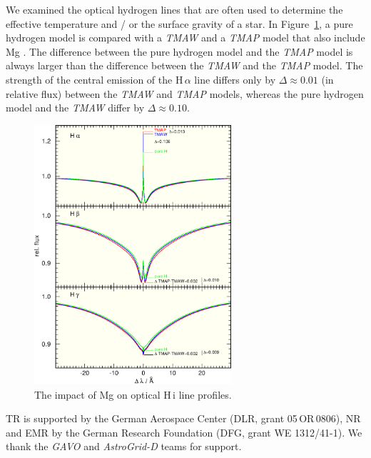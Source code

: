 We examined the optical hydrogen lines that are often used to determine the effective temperature and / or the surface gravity of a star. In Figure~\ref{fig:HMg}, a pure hydrogen model is compared with a \emph{TMAW} and a \emph{TMAP} model that also include Mg \citep[$T_\mathrm{eff}=60\,\mathrm{kK}$, $\log g = 7$, solar abundances,][]{asplundetal2009}. The difference between the pure hydrogen model and the  \emph{TMAP} model is always larger than the difference between the \emph{TMAW} and the \emph{TMAP} model. The strength of the central emission of the H\,$\alpha$ line differs only by $\Delta \approx 0.01$ (in relative flux) between the \emph{TMAW} and \emph{TMAP} models, whereas the pure hydrogen model and the \emph{TMAW} differ by $\Delta \approx 0.10$.


\begin{figure}[ht!]\centering
\includegraphics[width=0.65\textwidth]{part9/Rauch_P24/p24_f3.eps}
\caption{The impact of Mg on optical H\,{\sc i} line profiles.}
\label{fig:HMg}
\end{figure}


\acknowledgements 
TR is supported by the German Aerospace Center (DLR, grant 05\,OR\,0806), NR and EMR by the German Research Foundation (DFG, grant WE 1312/41-1). We thank the \emph{GAVO} and \emph{AstroGrid-D} teams for support.



